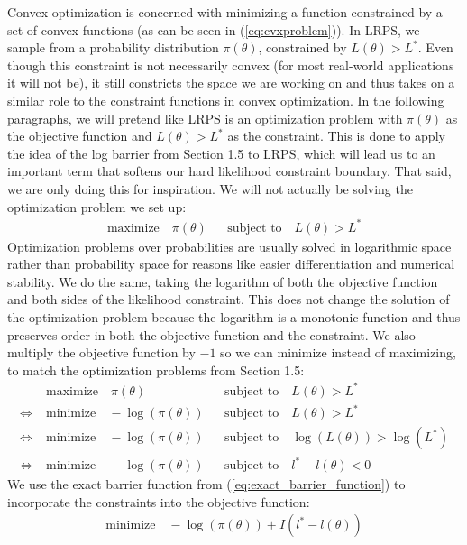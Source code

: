 \documentclass[12pt, a4paper]{report}
\begin{document}
Convex optimization is concerned with minimizing a function constrained by a set of convex functions (as can be seen in (\ref{eq:cvxproblem})).
In LRPS, we sample from a probability distribution $\pi(\theta)$, constrained by $L(\theta) > L^*$.
Even though this constraint is not necessarily convex (for most real-world applications it will not be), it still constricts the space we are working on and thus takes on a similar role to the constraint functions in convex optimization.
In the following paragraphs, we will pretend like LRPS is an optimization problem with $\pi(\theta)$ as the objective function and $L(\theta) > L^*$ as the constraint.
This is done to apply the idea of the log barrier from Section 1.5 to LRPS, which will lead us to an important term that softens our hard likelihood constraint boundary.
That said, we are only doing this for inspiration.
We will not actually be solving the optimization problem we set up:
\begin{align}
    \textrm{maximize} \quad \pi(\theta) &&\textrm{subject to} \quad L(\theta) > L^* \nonumber
\end{align}
Optimization problems over probabilities are usually solved in logarithmic space rather than probability space for reasons like easier differentiation and numerical stability.
We do the same, taking the logarithm of both the objective function and both sides of the likelihood constraint.
This does not change the solution of the optimization problem because the logarithm is a monotonic function and thus preserves order in both the objective function and the constraint.
We also multiply the objective function by $-1$ so we can minimize instead of maximizing, to match the optimization problems from Section 1.5: 
\begin{align}
    &\textrm{maximize} \quad \pi(\theta) &&\textrm{subject to} \quad L(\theta) > L^* \nonumber \nonumber \\
    \iff \; &\textrm{minimize} \quad -\log(\pi(\theta)) &&\textrm{subject to} \quad L(\theta) > L^* \nonumber\\
    \iff \; &\textrm{minimize} \quad -\log(\pi(\theta)) &&\textrm{subject to} \quad \log(L(\theta)) > \log(L^*) \nonumber\\
    \iff \; &\textrm{minimize} \quad -\log(\pi(\theta)) &&\textrm{subject to} \quad l^* - l(\theta) < 0 \nonumber
\end{align}
We use the exact barrier function from (\ref{eq:exact_barrier_function}) to incorporate the constraints into the objective function:
\begin{align}
    \textrm{minimize} \quad -\log(\pi(\theta)) + I(l^* - l(\theta)) \nonumber
\end{align}
\end{document}
